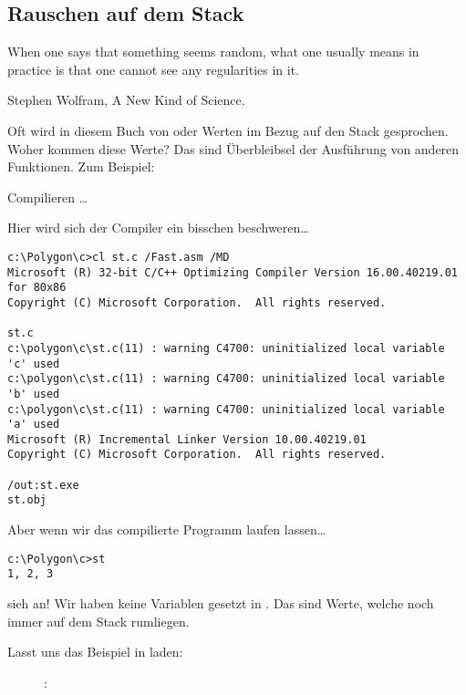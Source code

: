 \subsection{Rauschen auf dem Stack}
\label{noise_in_stack}

\epigraph{When one says that something seems random, what one usually
means in practice is that one cannot see any regularities in it.}{Stephen Wolfram, A New Kind of Science.}

Oft wird in diesem Buch von  oder  Werten im Bezug
auf den Stack gesprochen. Woher kommen diese Werte? Das sind Überbleibsel der
Ausführung von anderen Funktionen. Zum Beispiel: 



Compilieren \dots



Hier wird sich der Compiler ein bisschen beschweren\dots

\begin{lstlisting}
c:\Polygon\c>cl st.c /Fast.asm /MD
Microsoft (R) 32-bit C/C++ Optimizing Compiler Version 16.00.40219.01 for 80x86
Copyright (C) Microsoft Corporation.  All rights reserved.

st.c
c:\polygon\c\st.c(11) : warning C4700: uninitialized local variable 'c' used
c:\polygon\c\st.c(11) : warning C4700: uninitialized local variable 'b' used
c:\polygon\c\st.c(11) : warning C4700: uninitialized local variable 'a' used
Microsoft (R) Incremental Linker Version 10.00.40219.01
Copyright (C) Microsoft Corporation.  All rights reserved.

/out:st.exe
st.obj
\end{lstlisting}

Aber wenn wir das compilierte Programm laufen lassen\dots

\begin{lstlisting}
c:\Polygon\c>st
1, 2, 3
\end{lstlisting}

sieh an! Wir haben keine Variablen gesetzt in .
Das sind  Werte, welche noch immer auf dem Stack rumliegen.

\clearpage
Lasst uns das Beispiel in \olly laden:

\begin{figure}[H]
\centering
{}
\caption{\olly: }
\label{fig:stack_noise_olly1}
\end{figure}

